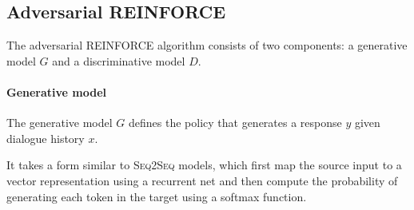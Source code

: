 \documentclass[11pt]{article}
\newcommand{\sts}{{{\textsc{Seq2Seq}}}\xspace}
\begin{document}
\begin{comment}
The learning system consists of two agents. 
We use $p$ to denote sentences generated from the first agent and  $q$ to denote sentences from the second. The two agents take turns talking with each other. A dialogue can be represented as an alternating sequence of sentences generated by the two agents: $U=\{p_1, q_1, p_2, q_2, ..., p_{i}, q_{i}\}$.  We view the generated sentences as actions that are taken according to a policy defined by an
encoder-decoder recurrent neural network.
\end{comment}
\subsection{Adversarial REINFORCE}
The adversarial REINFORCE algorithm consists of two components:
a generative model $G$ and a discriminative model $D$.

\paragraph{Generative model} The generative model $G$ defines the
 policy that generates a response $y$ given dialogue history $x$. 
 \begin{comment}
  , namely $p_{i}=\{w_1,w_2,...,w_N\}$, 
  given the dialogue history, denoted $\pi(p_{i}|p_{i-1},q_{i-1})$\footnote{ We found that using more than 2 context yields very tiny performance boost.
We therefore approximate the dialogue history using the concatenation of two preceding utterances. }. 
\end{comment}
It takes a  form similar to \sts models, which first map the source input to a vector representation using a recurrent net
and then compute the probability of generating each token in the target using a softmax function.
\begin{comment}
\begin{equation}
\begin{aligned}
&\pi(p_{i}|p_{i-1},q_{i-1})=\\
&~~~~~~~~~\prod_{w_t\in p_{i}} \pi(w_t|w_1,...,w_{t-1},p_{i-1},q_{i-1})
\end{aligned}
\label{eq2}
\end{equation}
\end{comment}
\end{document}
